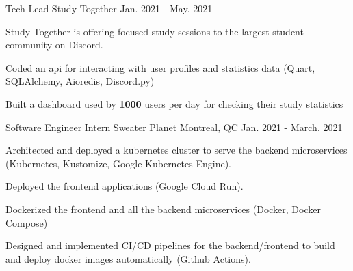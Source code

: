 

\begin{cventries}



  \cventry
  {Tech Lead}
  {Study Together}
  {}
  {Jan. 2021 - May. 2021}
  {
    \begin{cvitems}
      \item{Study Together is offering focused study sessions to the largest student community on Discord.}
      \item{Coded an api for interacting with user profiles and statistics data (Quart, SQLAlchemy, Aioredis, Discord.py)}
      \item{Built a dashboard used by \textbf{1000} users per day for checking their study statistics}
    \end{cvitems}
  }

  \cventry
    {Software Engineer Intern} %
    {Sweater Planet} %
    {Montreal, QC} %
    {Jan. 2021 - March. 2021} %
    {
      \begin{cvitems} %
      \item{Architected and deployed a kubernetes cluster to serve the backend microservices (Kubernetes, Kustomize, Google Kubernetes Engine).} 
      \item{Deployed the frontend applications (Google Cloud Run).}
      \item{Dockerized the frontend and all the backend microservices (Docker, Docker Compose)}
      \item{Designed and implemented CI/CD pipelines for the backend/frontend to build and deploy docker images automatically (Github Actions).}
      \end{cvitems}
    }



\end{cventries}
